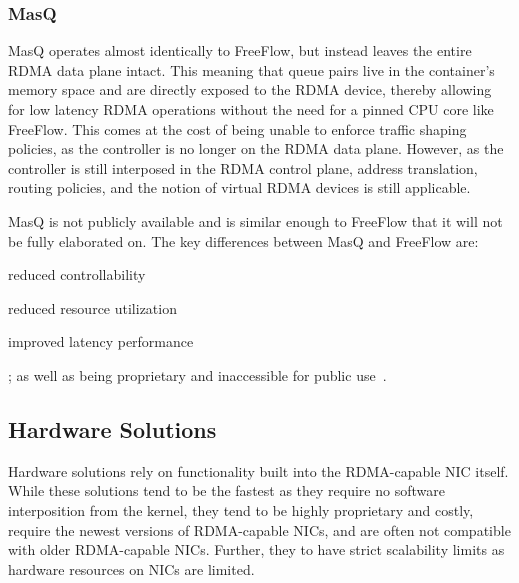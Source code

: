 \documentclass[12pt,titlepage]{article}
\begin{document}
\subsubsection{MasQ}
MasQ operates almost identically to FreeFlow, but instead leaves the entire RDMA data plane intact.
This meaning that queue pairs live in the container's memory space and are directly exposed to the RDMA device, thereby allowing for low latency RDMA operations without the need for a pinned CPU core like FreeFlow.
This comes at the cost of being unable to enforce traffic shaping policies, as the controller is no longer on the RDMA data plane.
However, as the controller is still interposed in the RDMA control plane, address translation, routing policies, and the notion of virtual RDMA devices is still applicable.

MasQ is not publicly available and is similar enough to FreeFlow that it will not be fully elaborated on.
The key differences between MasQ and FreeFlow are:
\begin{enumerate*}[label={(\arabic*)},itemjoin*={{, and }},itemjoin={{, }}]
	\item reduced controllability
	\item reduced resource utilization
	\item improved latency performance
\end{enumerate*};
as well as being proprietary and inaccessible for public use~\cite{he2020masq}.

\subsection{Hardware Solutions}
Hardware solutions rely on functionality built into the RDMA-capable NIC itself.
While these solutions tend to be the fastest as they require no software interposition from the kernel, they tend to be highly proprietary and costly, require the newest versions of RDMA-capable NICs, and are often not compatible with older RDMA-capable NICs.
Further, they to have strict scalability limits as hardware resources on NICs are limited.

\end{document}
